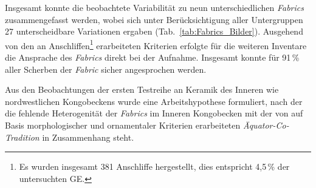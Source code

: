 \begin{multicols}{2}
Insgesamt konnte die beobachtete Variabilität zu neun unterschiedlichen \textit{Fabrics} zusammengefasst werden, wobei sich unter Berücksichtigung aller Untergruppen 27 unterscheidbare Variationen ergaben (Tab.~\ref{tab:Fabrics_Bilder}). Ausgehend von den an Anschliffen\footnote{Es wurden insgesamt 381 Anschliffe hergestellt, dies entspricht 4,5\,\% der untersuchten GE.} erarbeiteten Kriterien erfolgte für die weiteren Inventare die Ansprache des \textit{Fabrics} direkt bei der Aufnahme. Insgesamt konnte für 91\,\% aller Scherben der \textit{Fabric} sicher angesprochen werden. 

Aus den Beobachtungen der ersten Testreihe an Keramik des Inneren wie nordwestlichen Kongobeckens wurde eine Arbeitshypothese formuliert, nach der die fehlende Heterogenität der \textit{Fabrics} im Inneren Kongobecken mit der von \textcite[58--210]{Wotzka.1995} auf Basis morphologischer und ornamentaler Kriterien erarbeiteten \textit{Äquator-Co-Tradition} in Zusammenhang steht.

\end{multicols}
\clearpage

\clearpage
